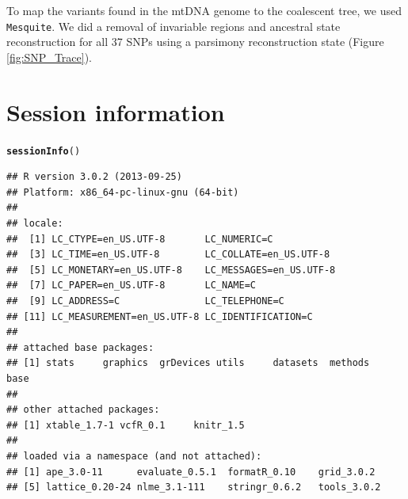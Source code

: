\documentclass{article}\usepackage[]{graphicx}\usepackage[]{color}
\makeatletter
\newcommand{\hlstd}[1]{\textcolor[rgb]{0.345,0.345,0.345}{#1}}%
\newcommand{\hlkwd}[1]{\textcolor[rgb]{0.737,0.353,0.396}{\textbf{#1}}}%
\newenvironment{kframe}{%
 \def\at@end@of@kframe{}%
 \ifinner\ifhmode%
  \def\at@end@of@kframe{\end{minipage}}%
  \begin{minipage}{\columnwidth}%
 \fi\fi%
 \def\FrameCommand##1{\hskip\@totalleftmargin \hskip-\fboxsep
 \colorbox{shadecolor}{##1}\hskip-\fboxsep
     \hskip-\linewidth \hskip-\@totalleftmargin \hskip\columnwidth}%
 \MakeFramed {\advance\hsize-\width
   \@totalleftmargin\z@ \linewidth\hsize
   \@setminipage}}%
 {\par\unskip\endMakeFramed%
 \at@end@of@kframe}
\newenvironment{knitrout}{}{} %
\makeatother
\begin{document}
To map the variants found in the mtDNA genome to the coalescent tree, we used \texttt{Mesquite}. We did a removal of invariable regions and ancestral state reconstruction for all 37 SNPs using a parsimony reconstruction state (Figure \ref{fig:SNP_Trace}).

\newpage






\vspace{24pt}


\section{Session information}

\begin{knitrout}
\color{fgcolor}\begin{kframe}
\begin{alltt}
\hlkwd{sessionInfo}\hlstd{()}
\end{alltt}
\begin{verbatim}
## R version 3.0.2 (2013-09-25)
## Platform: x86_64-pc-linux-gnu (64-bit)
## 
## locale:
##  [1] LC_CTYPE=en_US.UTF-8       LC_NUMERIC=C              
##  [3] LC_TIME=en_US.UTF-8        LC_COLLATE=en_US.UTF-8    
##  [5] LC_MONETARY=en_US.UTF-8    LC_MESSAGES=en_US.UTF-8   
##  [7] LC_PAPER=en_US.UTF-8       LC_NAME=C                 
##  [9] LC_ADDRESS=C               LC_TELEPHONE=C            
## [11] LC_MEASUREMENT=en_US.UTF-8 LC_IDENTIFICATION=C       
## 
## attached base packages:
## [1] stats     graphics  grDevices utils     datasets  methods   base     
## 
## other attached packages:
## [1] xtable_1.7-1 vcfR_0.1     knitr_1.5   
## 
## loaded via a namespace (and not attached):
## [1] ape_3.0-11      evaluate_0.5.1  formatR_0.10    grid_3.0.2     
## [5] lattice_0.20-24 nlme_3.1-111    stringr_0.6.2   tools_3.0.2
\end{verbatim}
\end{kframe}
\end{knitrout}






\end{document}
